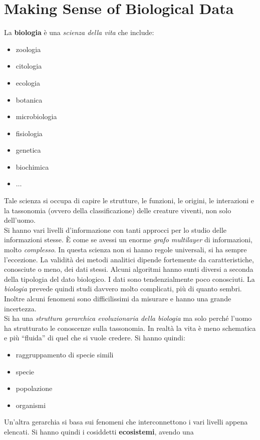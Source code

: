 \documentclass[a4paper,12pt, oneside]{book}
\begin{document}
\chapter{Making Sense of Biological Data}
La \textbf{biologia} è una \textit{scienza della vita} che include:
\begin{itemize}
  \item zoologia
  \item citologia
  \item ecologia
  \item botanica
  \item microbiologia
  \item fisiologia
  \item genetica
  \item biochimica
  \item $\ldots$
\end{itemize}
Tale scienza si occupa di capire le strutture, le funzioni, le origini, le
interazioni e la tassonomia (ovvero della classificazione) delle creature
viventi, non solo dell'uomo.\\
Si hanno vari livelli d'informazione con tanti approcci per lo studio delle
informazioni stesse. È come se avessi un enorme \textit{grafo multilayer} di
informazioni, molto \textit{complesso}. In questa scienza non si hanno regole
universali, si ha sempre l'eccezione. La validità dei metodi analitici dipende
fortemente da caratteristiche, conosciute o meno, dei dati stessi. Alcuni
algoritmi hanno sunti diversi a seconda della tipologia del dato biologico. I
dati sono tendenzialmente poco conosciuti. La \textit{biologia} prevede quindi
studi davvero molto complicati, più di quanto sembri. Inoltre alcuni fenomeni
sono difficilissimi da misurare e hanno una grande incertezza.\\ 
Si ha una \textit{struttura gerarchica evoluzionaria della biologia} ma solo
perché l'uomo ha strutturato le conoscenze sulla tassonomia. In realtà la vita è
meno schematica e più ``fluida'' di quel che si vuole credere. Si hanno quindi:
\begin{itemize}
  \item raggruppamento di specie simili
  \item specie 
  \item popolazione
  \item organismi
\end{itemize}
Un'altra gerarchia si basa sui fenomeni che interconnettono i vari livelli
appena elencati. Si hanno quindi i cosiddetti \textbf{ecosistemi}, avendo una
\end{document}
